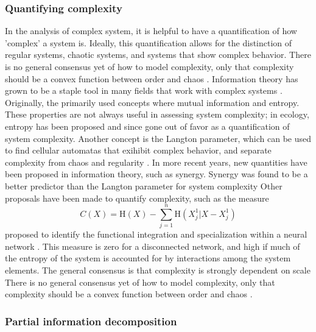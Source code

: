 \documentclass[../main.tex]{subfiles}
\begin{document}
\subsubsection{Quantifying complexity}

In the analysis of complex system, it is helpful to have a quantification of how 'complex' a system is.
Ideally, this quantification allows for the distinction of regular systems, chaotic systems, and systems that show complex behavior.
There is no general consensus yet of how to model complexity, only that complexity should be a convex function between order and chaos \cite{bar2013computationally}.
Information theory has grown to be a staple tool in many fields that work with complex systems \cite{williams2010nonnegative}. %
Originally, the primarily used concepts where mutual information and entropy.
These properties are not always useful in assessing system complexity; in ecology, entropy has been proposed and since gone out of favor as a quantification of system complexity.
Another concept is the Langton parameter, which can be used to find cellular automatas that exihibit complex behavior, and separate complexity from chaos and regularity \cite{langton1990computation}.
In more recent years, new quantities have been proposed in information theory, such as synergy.
Synergy was found to be a better predictor than the Langton parameter for system complexity \cite{9999QuaxChli}
Other proposals have been made to quantify complexity, such as the measure
%
\begin{equation}
C(X) = \mathrm{H}(X) - \sum_{j=1}^n \mathrm{H}(X_j^1 | X - X_j^1)
\end{equation}
%
proposed to identify the functional integration and specialization within a neural network \cite{tononi1999measures}. This measure is zero for a disconnected network, and high if much of the entropy of the system is accounted for by interactions among the system elements.
The general consensus is that complexity is strongly dependent on scale 
There is no general consensus yet of how to model complexity, only that complexity should be a convex function between order and chaos \cite{bar2013computationally}.

\subsubsection{Partial information decomposition}
\end{document}
